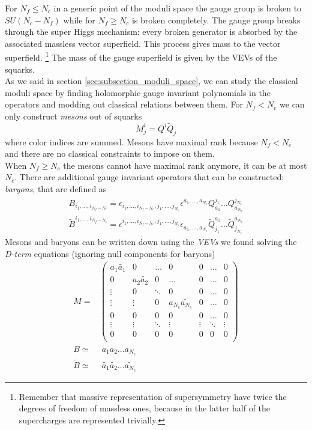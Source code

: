 For $N_f \le N_c$ in a generic point of the moduli space the gauge group is broken to $SU(N_c - N_f)$ while for $N_f \geq N_c$ is broken completely.
The gauge group breaks through the super Higgs mechanism: every broken generator is absorbed by the associated massless vector superfield.
This process gives mass to the vector superfield.  
\footnote{Remember that massive representation of supersymmetry have twice the degrees of freedom of massless ones, because in the latter half of the supercharges are represented trivially.}
The mass of the gauge superfield is given by the VEVs of the squarks.
\\
As we said in section \ref{sec:subsection_moduli_space}, we can  study the classical moduli space by finding holomorphic gauge invariant polynomials in the operators and modding out classical relations between them.
For $N_f < N_c$ we can only construct \emph{mesons} out of squarks
\begin{equation}
  M^i_j = Q^i \tilde{Q}_j
 \end{equation} 
where color indices are summed. 
Mesons have maximal rank because $N_f < N_c$ and there are no  classical constraints to impose on them. \\
When $N_f \geq N_c$ the mesons cannot have maximal rank anymore, it can be at most $N_c$.
There are additional gauge invariant operators that can be constructed: \emph{baryons}, that are defined as
\begin{align}
 B_{ i_1, \dotsc, i_{N_f - N_c}} = \epsilon_{i_1, \dotsc, i_{N_f - N_c}, j_1 ,\dotsc, j_{N_c}} \epsilon^{a_1 , \dotsc, a_{N_c}} Q^{j_1}_{a_1} \dots Q^{j_{N_c}}_{a_{N_c}}
 \\
 \tilde{B}^{ i_1, \dotsc, i_{N_f - N_c}} = \epsilon^{i_1, \dotsc, i_{N_f - N_c}, j_1 , \dotsc, j_{N_c}} \epsilon_{a_1 , \dotsc, a_{N_c}} \tilde{Q}_{j_1}^{a_1} \dots \tilde{Q}_{j_{N_c}}^{a_{N_c}}
\end{align}
Mesons and baryons can be written down using the \emph{VEVs} we found solving the \emph{D-term} equations (ignoring null components for baryons)
\begin{align}
M =& \begin{pmatrix}
a_1 \tilde{a_1} & 0  & \dots& 0   & 0 & \dots & 0  \\
	0			& a_2 \tilde{a_2}	& 0 		&	 \dots 	 & 0  & \dots & 0 \\
	\vdots			&	0			 	& \ddots&	0	& 0  &\dots	&0  \\
	\vdots			&	\vdots				&		0 & a_{N_c} \tilde{a_{N_c}} &  0 & \dots & 0 \\
	0			& 0 & 0 &0  &0   & \dots & 0 \\	
	\vdots			& \vdots&\ddots &\vdots &\vdots &\ddots & \vdots \\	
	0			& 0& 0 & 0 &0  &0 & 0 \\	
\end{pmatrix}
\\
B  \simeq & \;  a_1 a_2 \dots a_{N_c} 
\\
\tilde{B} \simeq & \;  \tilde{a_1} \tilde{a_2}\dots \tilde{a_{N_c}}
\end{align}
